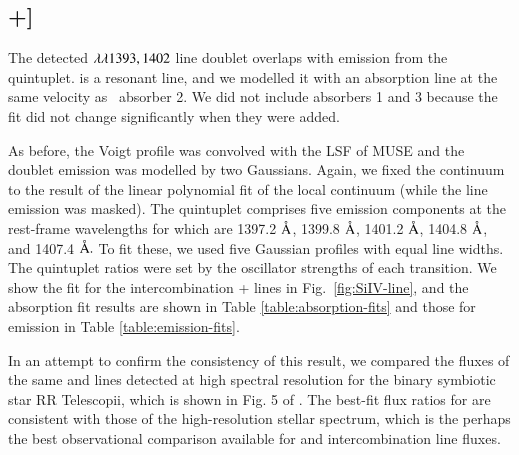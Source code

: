\subsection{+]}\label{section:SiIV-fit}

The detected  $\lambda\lambda1393,1402$ line doublet overlaps with emission from the \ion{O}{IV]} quintuplet.  is a resonant line, and we modelled it with an absorption line at the same velocity as \lya~absorber 2. We did not include absorbers 1 and 3 because the fit did not change significantly when they were added.  

As before, the Voigt profile was convolved with the LSF of MUSE and the  doublet emission  was modelled by two Gaussians. Again, we fixed the continuum to the result of the linear polynomial fit of the local continuum (while the line emission was masked). The \ion{O}{IV]} quintuplet comprises five emission components at the rest-frame wavelengths for \ion{O}{IV],} which are 1397.2 $\mbox{\normalfont\AA }$, 1399.8 $\mbox{\normalfont\AA }$, 1401.2 $\mbox{\normalfont\AA }$, 1404.8 $\mbox{\normalfont\AA }$, and 1407.4 $\mbox{\normalfont\AA }.$ To fit these, we used five Gaussian profiles with equal line widths. The quintuplet ratios were set by the oscillator strengths of each transition. We show the fit for the intercombination +\ion{O}{IV]} lines in Fig.~\ref{fig:SiIV-line}, and the absorption fit results are shown in Table \ref{table:absorption-fits} and those for emission in Table \ref{table:emission-fits}. 

In an attempt to confirm the consistency of this result, we compared the fluxes of the same  and \ion{O}{IV]} lines detected at high spectral resolution for the binary symbiotic star RR Telescopii, which is shown in Fig. 5 of \citet{keenan2002}. The best-fit flux ratios for \ion{O}{IV]} are consistent with those of the high-resolution stellar spectrum, which is the perhaps the best observational comparison available for  and \ion{O}{IV]} intercombination line fluxes. 

